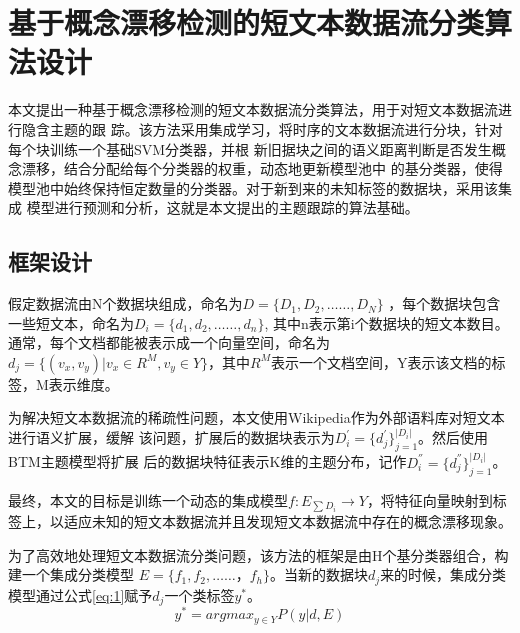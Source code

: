 \chapter{基于概念漂移检测的短文本数据流分类算法设计}

本文提出一种基于概念漂移检测的短文本数据流分类算法，用于对短文本数据流进行隐含主题的跟
踪。该方法采用集成学习，将时序的文本数据流进行分块，针对每个块训练一个基础SVM分类器，并根
新旧据块之间的语义距离判断是否发生概念漂移，结合分配给每个分类器的权重，动态地更新模型池中
的基分类器，使得模型池中始终保持恒定数量的分类器。对于新到来的未知标签的数据块，采用该集成
模型进行预测和分析，这就是本文提出的主题跟踪的算法基础。


\section{框架设计}

假定数据流由N个数据块组成，命名为$D = \{
D_1,  D_2,  …… , D_N \}$ ，每个数据块包含一些短文本，命名为$D_i = \{ d_1, d_2, …… , d_n \}$,
其中n表示第i个数据块的短文本数目。
通常，每个文档都能被表示成一个向量空间，命名为$d_j = \{ (v_x, v_y)  |  v_x \in R^M, v_y
\in Y\}$，其中$R^M$表示一个文档空间，Y表示该文档的标签，M表示维度。

为解决短文本数据流的稀疏性问题，本文使用Wikipedia作为外部语料库对短文本进行语义扩展，缓解
该问题，扩展后的数据块表示为$D_i^{'}=\{d_j^{'}\}_{j=1}^{|D_i|}$。然后使用BTM主题模型将扩展
后的数据块特征表示K维的主题分布，记作$D_i^{''}=\{d_j^{''}\}_{j=1}^{|D_i|}$。


最终，本文的目标是训练一个动态的集成模型$f : E_{\sum{D_i}}
\rightarrow Y$，将特征向量映射到标签上，以适应未知的短文本数据流并且发现短文本数据流中存在的概念漂移现象。

为了高效地处理短文本数据流分类问题，该方法的框架是由H个基分类器组合，构建一个集成分类模型 $E = \{ f_1, f_2, ……，f_h \}$。当新的数据块$d_j$来的时候，集成分类模型通过公式\ref{eq:1}赋予$d_j$一个类标签$y^*$。
  \begin{equation}
    \label{eq:predict}
    y^* = argmax_{y \in Y}P(y|d, E)     
  \end{equation}
    
